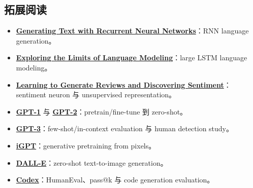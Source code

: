 \documentclass[a4paper]{article}
\begin{document}
\subsection{拓展阅读}

{\small
\begin{itemize}[nosep,leftmargin=*]
  \item \href{https://www.cs.utoronto.ca/~ilya/pubs/2011/LANG-RNN.pdf}{\textbf{Generating Text with Recurrent Neural Networks}}：RNN language generation。
  \item \href{https://arxiv.org/abs/1602.02410}{\textbf{Exploring the Limits of Language Modeling}}：large LSTM language modeling。
  \item \href{https://arxiv.org/abs/1704.01444}{\textbf{Learning to Generate Reviews and Discovering Sentiment}}：sentiment neuron 与 unsupervised representation。
  \item \href{https://cdn.openai.com/research-covers/language-unsupervised/language_understanding_paper.pdf}{\textbf{GPT-1}} 与 \href{https://cdn.openai.com/better-language-models/language_models_are_unsupervised_multitask_learners.pdf}{\textbf{GPT-2}}：pretrain/fine-tune 到 zero-shot。
  \item \href{https://arxiv.org/abs/2005.14165}{\textbf{GPT-3}}：few-shot/in-context evaluation 与 human detection study。
  \item \href{https://arxiv.org/abs/2006.10738}{\textbf{iGPT}}：generative pretraining from pixels。
  \item \href{https://arxiv.org/abs/2102.12092}{\textbf{DALL-E}}：zero-shot text-to-image generation。
  \item \href{https://arxiv.org/abs/2107.03374}{\textbf{Codex}}：HumanEval、pass@k 与 code generation evaluation。
\end{itemize}
}
\end{document}
